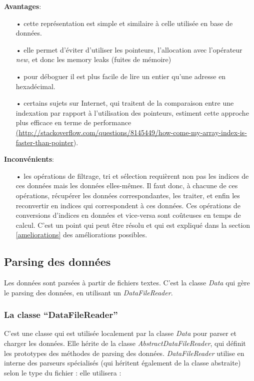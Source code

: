\documentclass[12pt]{article}
\begin{document}
		\textbf{Avantages}:
		\begin{itemize}
			\item[•] cette représentation est simple et similaire à celle utilisée en base de données.
			\item[•] elle permet d'éviter d’utiliser les pointeurs, l’allocation avec l’opérateur \textit{new}, et donc les memory leaks (fuites de mémoire)
			\item[•] pour déboguer il est plus facile de lire un entier qu’une adresse
			en hexadécimal.
			\item[•] certains sujets sur Internet, qui traitent de la comparaison entre
			une indexation par rapport à l’utilisation des pointeurs, estiment
			cette approche plus efficace en terme de performance
			\sloppy
			\url{(http://stackoverflow.com/questions/8145449/how-come-my-array-index-is-faster-than-pointer}).\\
		\end{itemize}
			
		\textbf{Inconvénients}:
		\begin{itemize}
			\item[•] les opérations de filtrage, tri et sélection requièrent non pas les
			indices de ces données mais les données elles-mêmes. Il faut donc, à chacune de
			ces opérations, récupérer les données correspondantes, les traiter, et enfin
			les reconvertir en indices qui correspondent à ces données. Ces opérations
			de conversions d'indices en données et vice-versa sont coûteuses en temps
			de calcul. C’est un point qui peut être résolu et qui est expliqué dans
			la section \ref{ameliorations} des améliorations possibles.
		\end{itemize}
			
		\subsection{Parsing des données}
		Les données sont parsées à partir de fichiers textes. C’est la classe \textit{Data} qui
		gère le parsing des données, en utilisant un \textit{DataFileReader}.
					
		\subsubsection{La classe “DataFileReader”}
	C’est une classe qui est utilisée localement par la classe \textit{Data} pour parser et charger les données. Elle hérite de la classe \textit{AbstractDataFileReader}, qui définit les prototypes des méthodes de parsing des données. \textit{DataFileReader} utilise en interne des parseurs spécialisés (qui héritent également de la classe abstraite) selon le type du fichier : elle utilisera :\\
	
\end{document}
